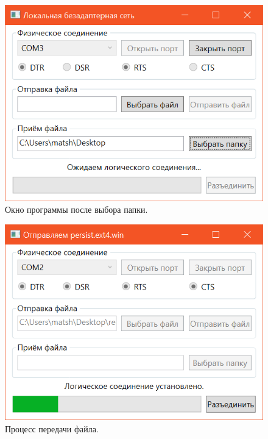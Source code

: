 \documentclass[a4paper,12pt]{article}
\begin{document}
\begin{figure}
\centering
\includegraphics{select.png}
\caption{Окно программы после выбора папки.}\label{select}
\end{figure}
\begin{figure}
\centering
\includegraphics{progress.png}
\caption{Процесс передачи файла.}\label{progress}
\end{figure}
\end{document}
